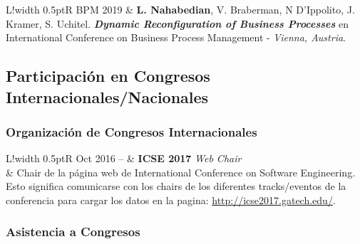 \documentclass[10pt]{article}
\newcommand\VRule{\color{lightgray}\vrule width 0.5pt}
\begin{document}
\begin{tabular}{L!{\VRule}R}
BPM 2019 & \textbf{L. Nahabedian}, V. Braberman, N D'Ippolito, J. Kramer, S. Uchitel.
\textbf{\textit{Dynamic Reconfiguration of Business Processes}} en International Conference on 
Business Process Management - \textit{Vienna, Austria}.\\
\end{tabular}

\subsection{Participación en Congresos Internacionales/Nacionales}

\subsubsection*{Organización de Congresos Internacionales}

\begin{tabular}{L!{\VRule}R}
Oct 2016 -- & \textbf{ICSE 2017} \textit{Web Chair}\\
& Chair de la página web de International Conference on Software Engineering. 
Esto significa 
comunicarse con los
chairs de los diferentes tracks/eventos de la conferencia para cargar los datos 
en la pagina: \url{http://icse2017.gatech.edu/}.\\
\end{tabular}


\subsubsection*{Asistencia a Congresos}
\end{document}
